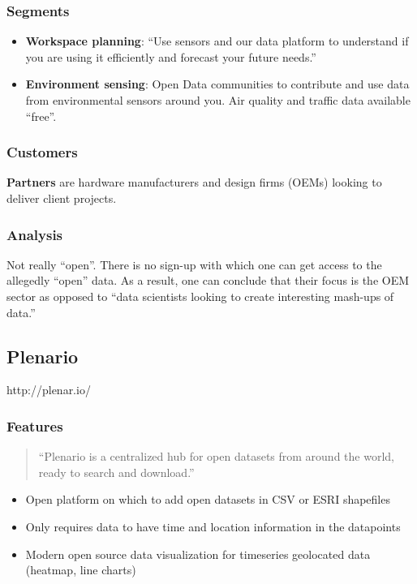 \subsubsection{Segments}\label{segments}

\begin{itemize}
\tightlist
\item
  \textbf{Workspace planning}: ``Use sensors and our data platform to
  understand if you are using it efficiently and forecast your future
  needs.''
\item
  \textbf{Environment sensing}: Open Data communities to contribute and
  use data from environmental sensors around you. Air quality and traffic data
  available ``free''.
\end{itemize}

\subsubsection{Customers}\label{customers}

\textbf{Partners} are hardware manufacturers and design firms (OEMs)
looking to deliver client projects.

\subsubsection{Analysis}\label{analysis}

Not really ``open''. There is no sign-up with which one can get access to
the allegedly ``open'' data. As a result, one can conclude that their
focus is the OEM sector as opposed to ``data scientists looking to
create interesting mash-ups of data.''


\subsection{Plenario}\label{plenario}

http://plenar.io/

\subsubsection{Features}\label{plenario-features}

\begin{quotation}
``Plenario is a centralized hub for open datasets from around the world,
ready to search and download.''
\end{quotation}

\begin{itemize}
\tightlist
\item
  Open platform on which to add open datasets in CSV or ESRI shapefiles
\item
  Only requires data to have time and location information in the datapoints
\item
  Modern open source data visualization for timeseries geolocated data (heatmap, line charts)
\end{itemize}

